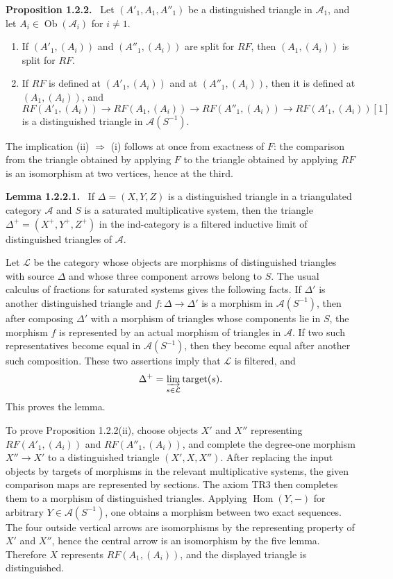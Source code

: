 \documentclass[12pt]{article}
\newcommand{\A}{\mathcal{A}}
\newcommand{\Hom}{\operatorname{Hom}}
\newcommand{\Ob}{\operatorname{Ob}}
\newenvironment{statement}[1]{\par\medskip\noindent\textbf{#1.}\ }{\par\medskip}
\begin{document}
\begin{statement}{Proposition 1.2.2}
Let \((A'_1,A_1,A''_1)\) be a distinguished triangle in \(\A_1\), and let \(A_i\in\Ob(\A_i)\) for \(i\ne1\).
\begin{enumerate}[label=(\roman*)]
\item If \((A'_1,(A_i))\) and \((A''_1,(A_i))\) are split for \(RF\), then \((A_1,(A_i))\) is split for \(RF\).
\item If \(RF\) is defined at \((A'_1,(A_i))\) and at \((A''_1,(A_i))\), then it is defined at \((A_1,(A_i))\), and
\[
 RF(A'_1,(A_i))\to RF(A_1,(A_i))\to RF(A''_1,(A_i))\to RF(A'_1,(A_i))[1]
\]
is a distinguished triangle in \(\A(S^{-1})\).
\end{enumerate}
\end{statement}

The implication (ii) \(\Rightarrow\) (i) follows at once from exactness of \(F\): the comparison from the triangle obtained by applying \(F\) to the triangle obtained by applying \(RF\) is an isomorphism at two vertices, hence at the third.

\begin{statement}{Lemma 1.2.2.1}
If \(\Delta=(X,Y,Z)\) is a distinguished triangle in a triangulated category \(\A\) and \(S\) is a saturated multiplicative system, then the triangle \(\Delta^+=(X^+,Y^+,Z^+)\) in the ind-category is a filtered inductive limit of distinguished triangles of \(\A\).
\end{statement}

Let \(\mathcal L\) be the category whose objects are morphisms of distinguished triangles with source \(\Delta\) and whose three component arrows belong to \(S\). The usual calculus of fractions for saturated systems gives the following facts. If \(\Delta'\) is another distinguished triangle and \(f:\Delta\to\Delta'\) is a morphism in \(\A(S^{-1})\), then after composing \(\Delta'\) with a morphism of triangles whose components lie in \(S\), the morphism \(f\) is represented by an actual morphism of triangles in \(\A\). If two such representatives become equal in \(\A(S^{-1})\), then they become equal after another such composition. These two assertions imply that \(\mathcal L\) is filtered, and
\[
 \Delta^+=\varinjlim_{s\in\mathcal L}\operatorname{target}(s).
\]
This proves the lemma.

To prove Proposition 1.2.2(ii), choose objects \(X'\) and \(X''\) representing \(RF(A'_1,(A_i))\) and \(RF(A''_1,(A_i))\), and complete the degree-one morphism \(X''\to X'\) to a distinguished triangle \((X',X,X'')\). After replacing the input objects by targets of morphisms in the relevant multiplicative systems, the given comparison maps are represented by sections. The axiom TR3 then completes them to a morphism of distinguished triangles. Applying \(\Hom(Y,-)\) for arbitrary \(Y\in\A(S^{-1})\), one obtains a morphism between two exact sequences. The four outside vertical arrows are isomorphisms by the representing property of \(X'\) and \(X''\), hence the central arrow is an isomorphism by the five lemma. Therefore \(X\) represents \(RF(A_1,(A_i))\), and the displayed triangle is distinguished.
\end{document}
